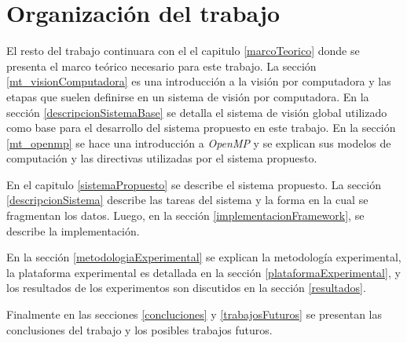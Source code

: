 
\section{Organización del trabajo}

El resto del trabajo continuara con el el capitulo \ref{marcoTeorico} donde se
presenta el marco teórico necesario para este trabajo. La sección
\ref{mt_visionComputadora} es una introducción a la visión por computadora y
las etapas que suelen definirse en un sistema de visión por computadora. En la
sección \ref{descripcionSistemaBase} se detalla el sistema de visión global
utilizado como base para el desarrollo del sistema propuesto en este trabajo.
En la sección \ref{mt_openmp} se hace una introducción a \emph{OpenMP} y se
explican sus modelos de computación y las directivas utilizadas por el sistema
propuesto.

En el capitulo \ref{sistemaPropuesto} se describe el sistema propuesto. La
sección \ref{descripcionSistema} describe las tareas del sistema y la forma en
la cual se fragmentan los datos. Luego, en la sección
\ref{implementacionFramework}, se describe la implementación.

En la sección \ref{metodologiaExperimental} se explican la metodología
experimental, la plataforma experimental es detallada en la sección
\ref{plataformaExperimental}, y los resultados de los experimentos son
discutidos en la sección \ref{resultados}.

Finalmente en las secciones \ref{concluciones} y \ref{trabajosFuturos} se
presentan las conclusiones del trabajo y los posibles trabajos futuros.

